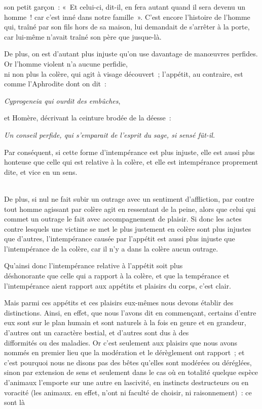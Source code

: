\documentclass[french,twoside]{book} %
\begin{document}
son petit garçon : « Et celui-ci, dit-il, en fera autant quand il sera devenu un homme ! car c’est inné dans notre famille ». C’est encore l’histoire de l’homme qui, traîné par son fils hors de sa maison, lui demandait de s’arrêter à la porte, car lui-même n’avait traîné son père que jusque-là.\par
De plus, on est d’autant plus injuste qu’on use davantage de manœuvres perfides. Or l’homme violent n’a aucune perfidie, \\
ni non plus la colère, qui agit à visage découvert ; l’appétit, au contraire, est comme l’Aphrodite dont on dit :\par
{\itshape Cyprogeneia qui ourdit des embûches}, \par
et Homère, décrivant la ceinture brodée de la déesse :\par
 {\itshape Un conseil perfide, qui s’emparait de l’esprit du sage, si sensé fût-il.} \par
Par conséquent, si cette forme d’intempérance est plus injuste, elle est aussi plus honteuse que celle qui est relative à la colère, et elle est intempérance proprement dite, et vice en un sens.\par
\\
De plus, si nul ne fait subir un outrage avec un sentiment d’affliction, par contre tout homme agissant par colère agit en ressentant de la peine, alors que celui qui commet un outrage le fait avec accompagnement de plaisir. Si donc les actes contre lesquels une victime se met le plus justement en colère sont plus injustes que d’autres, l’intempérance causée par l’appétit est aussi plus injuste que l’intempérance de la colère, car il n’y a dans la colère aucun outrage.\par
Qu’ainsi donc l’intempérance relative à l’appétit soit plus \\
déshonorante que celle qui a rapport à la colère, et que la tempérance et l’intempérance aient rapport aux appétits et plaisirs du corps, c’est clair.\par
Mais parmi ces appétits et ces plaisirs eux-mêmes nous devons établir des distinctions. Ainsi, en effet, que nous l’avons dit en commençant, certains d’entre eux sont sur le plan humain et sont naturels à la fois en genre et en grandeur, d’autres ont un caractère bestial, et d’autres sont dus à des \\
difformités ou des maladies. Or c’est seulement aux plaisirs que nous avons nommés en premier lieu que la modération et le dérèglement ont rapport ; et c’est pourquoi nous ne disons pas des bêtes qu’elles sont modérées ou déréglées, sinon par extension de sens et seulement dans le cas où en totalité quelque espèce d’animaux l’emporte sur une autre en lascivité, en instincts destructeurs ou en voracité (les animaux. en effet, n’ont ni faculté de choisir, ni raisonnement) : ce sont là \\
\end{document}
